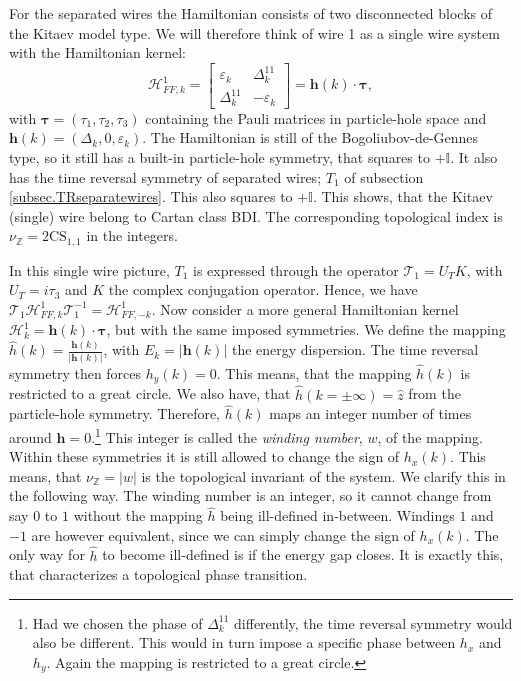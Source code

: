 For the separated wires the Hamiltonian consists of two disconnected blocks of the Kitaev model type. We will therefore think of wire 1 as a single wire system with the Hamiltonian kernel:
\begin{equation}
\mathcal{H}^{1}_{FF,k} = \begin{bmatrix} \varepsilon_k & \Delta^{11}_k \\ \Delta^{11}_k & -\varepsilon_k \end{bmatrix} = \mathbf{h}(k)\cdot\boldsymbol\tau,
\label{eq.singlewire.Hamiltoniankernel}
\end{equation}
with $\boldsymbol\tau = (\tau_1, \tau_2, \tau_3)$ containing the Pauli matrices in particle-hole space and $\mathbf{h}(k) = (\Delta_k, 0, \varepsilon_k)$. The Hamiltonian is still of the Bogoliubov-de-Gennes type, so it still has a built-in particle-hole symmetry, that squares to $+\mathbb{I}$. It also has the time reversal symmetry of separated wires; $T_1$ of subsection \ref{subsec.TRseparatewires}. This also squares to $+\mathbb{I}$.  This shows, that the Kitaev (single) wire belong to Cartan class BDI. The corresponding topological index is $\nu_{\mathbb{Z}} = 2\text{CS}_{1,1}$ in the integers. 

In this single wire picture, $T_1$ is expressed through the operator $\mathcal{T}_1 = U_TK$, with $U_T = i\tau_3$ and $K$ the complex conjugation operator. Hence, we have $\mathcal{T}_1\mathcal{H}^{1}_{FF,k}\mathcal{T}^{-1}_1 = \mathcal{H}^{1}_{FF,-k}$. Now consider a more general Hamiltonian kernel $\mathcal{H}^{1}_k = \mathbf{h}(k)\cdot\boldsymbol\tau$, but with the same imposed symmetries. We define the mapping $\hat{h}(k) = \frac{\mathbf{h}(k)}{|\mathbf{h}(k)|}$, with $E_k = |\mathbf{h}(k)|$ the energy dispersion. The time reversal symmetry then forces $h_y(k) = 0$. This means, that the mapping $\hat{h}(k)$ is restricted to a great circle. We also have, that $\hat{h}(k = \pm \infty) = \hat{z}$ from the particle-hole symmetry. Therefore, $\hat{h}(k)$ maps an integer number of times around $\mathbf{h} = 0$.\footnote{Had we chosen the phase of $\Delta^{11}_k$ differently, the time reversal symmetry would also be different. This would in turn impose a specific phase between $h_x$ and $h_y$. Again the mapping is restricted to a great circle.} This integer is called the \textit{winding number}, $w$, of the mapping. Within these symmetries it is still allowed to change the sign of $h_x(k)$. This means, that $\nu_{\mathbb{Z}} = |w|$ is the topological invariant of the system. We clarify this in the following way. The winding number is an integer, so it cannot change from say $0$ to $1$ without the mapping $\hat{h}$ being ill-defined in-between. Windings $1$ and $-1$ are however equivalent, since we can simply change the sign of $h_x(k)$. The only way for $\hat{h}$ to become ill-defined is if the energy gap closes. It is exactly this, that characterizes a topological phase transition. 

